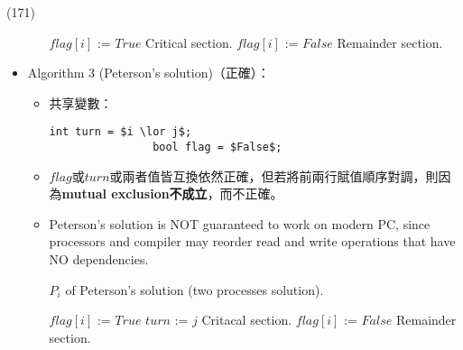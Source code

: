 \begin{theorem}{(171)}
\begin{itemize}
\begin{itemize}
\begin{algorithm}[H]
\begin{algorithmic}[1]
                        \Repeat 
                            \State $flag[i]$ := $True$
                            \EndWhile
                            \State Critical section.
                            \State $flag[i]$ := $False$
                            \State Remainder section.
                    \EndFunction
                \end{algorithmic}
            \end{algorithm} 
        \end{itemize}
        \item Algorithm 3 (Peterson's solution)（正確）：\begin{itemize}
            \item 共享變數：\begin{lstlisting}[caption={Shared variables of Peterson's solution (two processes solution).}, captionpos=b, mathescape=true]
                int turn = $i \lor j$;
                bool flag = $False$;
            \end{lstlisting}
            \item $flag$或$turn$或兩者值皆互換依然正確，但若將前兩行賦值順序對調，則因為\textbf{mutual exclusion不成立}，而不正確。
            \item Peterson's solution is NOT guaranteed to work on modern PC, since processors and compiler may reorder read and write operations that have NO dependencies.
            \begin{algorithm}[H]
                \caption{$P_i$ of Peterson's solution (two processes solution).}
                \begin{algorithmic}[1]
                        \Repeat 
                            \State $flag[i]$ := $True$
                            \State $turn$ := $j$
                            \EndWhile
                            \State Critacal section.
                            \State $flag[i]$ := $False$
                            \State Remainder section.
                    \EndFunction
                \end{algorithmic}
            \end{algorithm}
        \end{itemize}
    \end{itemize}
\end{theorem}

